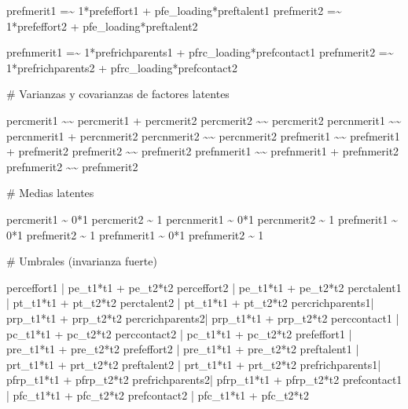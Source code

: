 \documentclass[
  12pt,
]{article}
\newenvironment{Shaded}{\begin{snugshade}}{\end{snugshade}}
\newcommand{\StringTok}[1]{\textcolor[rgb]{0.13,0.47,0.30}{#1}}
\begin{document}
\begin{Shaded}
\begin{Highlighting}[]
\StringTok{prefmerit1  =\textasciitilde{} 1*prefeffort1 + pfe\_loading*preftalent1}
\StringTok{prefmerit2  =\textasciitilde{} 1*prefeffort2 + pfe\_loading*preftalent2}

\StringTok{prefnmerit1 =\textasciitilde{} 1*prefrichparents1 + pfrc\_loading*prefcontact1}
\StringTok{prefnmerit2 =\textasciitilde{} 1*prefrichparents2 + pfrc\_loading*prefcontact2}


\StringTok{\# Varianzas y covarianzas de factores latentes}

\StringTok{percmerit1  \textasciitilde{}\textasciitilde{} percmerit1 + percmerit2}
\StringTok{percmerit2  \textasciitilde{}\textasciitilde{} percmerit2}
\StringTok{percnmerit1 \textasciitilde{}\textasciitilde{} percnmerit1 + percnmerit2}
\StringTok{percnmerit2 \textasciitilde{}\textasciitilde{} percnmerit2}
\StringTok{prefmerit1  \textasciitilde{}\textasciitilde{} prefmerit1 + prefmerit2}
\StringTok{prefmerit2  \textasciitilde{}\textasciitilde{} prefmerit2}
\StringTok{prefnmerit1 \textasciitilde{}\textasciitilde{} prefnmerit1 + prefnmerit2}
\StringTok{prefnmerit2 \textasciitilde{}\textasciitilde{} prefnmerit2}


\StringTok{\# Medias latentes}

\StringTok{percmerit1  \textasciitilde{} 0*1}
\StringTok{percmerit2  \textasciitilde{} 1}
\StringTok{percnmerit1 \textasciitilde{} 0*1}
\StringTok{percnmerit2 \textasciitilde{} 1}
\StringTok{prefmerit1  \textasciitilde{} 0*1}
\StringTok{prefmerit2  \textasciitilde{} 1}
\StringTok{prefnmerit1 \textasciitilde{} 0*1}
\StringTok{prefnmerit2 \textasciitilde{} 1}


\StringTok{\# Umbrales (invarianza fuerte)}

\StringTok{perceffort1     | pe\_t1*t1 + pe\_t2*t2}
\StringTok{perceffort2     | pe\_t1*t1 + pe\_t2*t2}
\StringTok{perctalent1     | pt\_t1*t1 + pt\_t2*t2}
\StringTok{perctalent2     | pt\_t1*t1 + pt\_t2*t2}
\StringTok{percrichparents1| prp\_t1*t1 + prp\_t2*t2}
\StringTok{percrichparents2| prp\_t1*t1 + prp\_t2*t2}
\StringTok{perccontact1    | pc\_t1*t1 + pc\_t2*t2}
\StringTok{perccontact2    | pc\_t1*t1 + pc\_t2*t2}
\StringTok{prefeffort1     | pre\_t1*t1 + pre\_t2*t2}
\StringTok{prefeffort2     | pre\_t1*t1 + pre\_t2*t2}
\StringTok{preftalent1     | prt\_t1*t1 + prt\_t2*t2}
\StringTok{preftalent2     | prt\_t1*t1 + prt\_t2*t2}
\StringTok{prefrichparents1| pfrp\_t1*t1 + pfrp\_t2*t2}
\StringTok{prefrichparents2| pfrp\_t1*t1 + pfrp\_t2*t2}
\StringTok{prefcontact1    | pfc\_t1*t1 + pfc\_t2*t2}
\StringTok{prefcontact2    | pfc\_t1*t1 + pfc\_t2*t2}



\end{Highlighting}
\end{Shaded}
\end{document}
